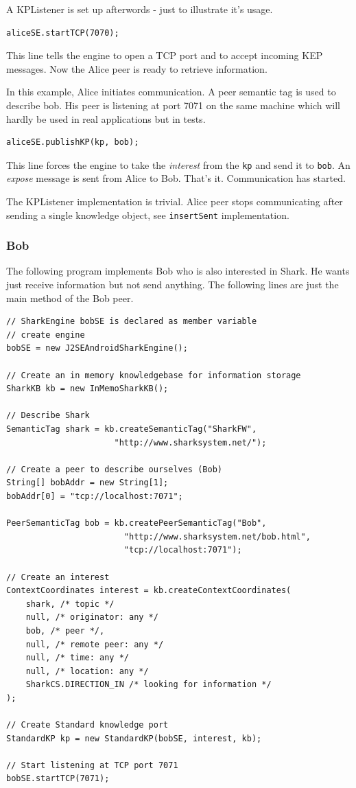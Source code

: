 A KPListener is set up afterwords - just to illustrate it's usage.

\begin{verbatim}
aliceSE.startTCP(7070);
\end{verbatim}

This line tells the engine to open a TCP port and to accept incoming KEP messages. Now the Alice peer is ready to retrieve information. 

In this example, Alice initiates communication. A peer semantic tag is used to describe bob. His peer is listening at port 7071 on the same machine which will hardly be used in real applications but in tests.

\begin{verbatim}
aliceSE.publishKP(kp, bob);
\end{verbatim}

This line forces the engine to take the {\it interest} from the {\tt kp} and send it to {\tt bob}. An {\it expose} message is sent from Alice to Bob. That's it. Communication has started.

The KPListener implementation is trivial. Alice peer stops communicating after sending a single knowledge object, see {\tt insertSent} implementation.

\subsubsection{Bob}
The following program implements Bob who is also interested in Shark. He wants just receive information but not send anything. The following lines are just the main method of the Bob peer.

\begin{verbatim}
// SharkEngine bobSE is declared as member variable
// create engine
bobSE = new J2SEAndroidSharkEngine();

// Create an in memory knowledgebase for information storage
SharkKB kb = new InMemoSharkKB();

// Describe Shark
SemanticTag shark = kb.createSemanticTag("SharkFW", 
                      "http://www.sharksystem.net/");

// Create a peer to describe ourselves (Bob)
String[] bobAddr = new String[1];
bobAddr[0] = "tcp://localhost:7071";

PeerSemanticTag bob = kb.createPeerSemanticTag("Bob", 
                        "http://www.sharksystem.net/bob.html", 
                        "tcp://localhost:7071");

// Create an interest 
ContextCoordinates interest = kb.createContextCoordinates(
    shark, /* topic */ 
    null, /* originator: any */
    bob, /* peer */,
    null, /* remote peer: any */ 
    null, /* time: any */
    null, /* location: any */ 
    SharkCS.DIRECTION_IN /* looking for information */
);

// Create Standard knowledge port
StandardKP kp = new StandardKP(bobSE, interest, kb);

// Start listening at TCP port 7071
bobSE.startTCP(7071);
\end{verbatim}

